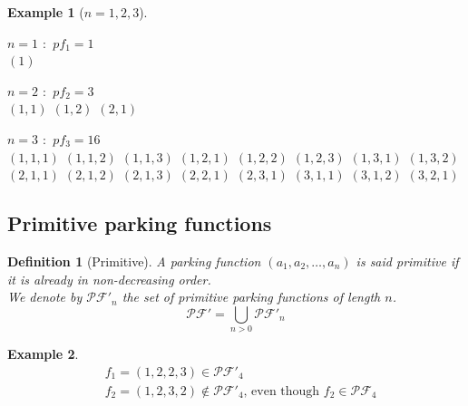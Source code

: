\documentclass[12pt]{report}
\newtheorem{definition}{Definition}
\newtheorem*{example}{Example}
\begin{document}
\begin{example}[$n = 1, 2, 3$]
    \text{} \\
    \begin{itemize*}
            \item $n = 1$ \text{ } $:$ \text{ } $pf_1 = 1$\\
            \subitem $(1)$\\
            \item $n = 2$ \text{ } $:$ \text{ } $pf_2 = 3$\\
            \subitem $(1, 1)$
            \subitem $(1, 2)$
            \subitem $(2, 1)$\\
            \item $n = 3$ \text{ } $:$ \text{ } $pf_3 = 16$\\
            \subitem $(1, 1, 1)$
            \subitem $(1, 1, 2)$
            \subitem $(1, 1, 3)$
            \subitem $(1, 2, 1)$
            \subitem $(1, 2, 2)$
            \subitem $(1, 2, 3)$
            \subitem $(1, 3, 1)$
            \subitem $(1, 3, 2)$
            \subitem $(2, 1, 1)$
            \subitem $(2, 1, 2)$
            \subitem $(2, 1, 3)$
            \subitem $(2, 2, 1)$
            \subitem $(2, 3, 1)$
            \subitem $(3, 1, 1)$
            \subitem $(3, 1, 2)$
            \subitem $(3, 2, 1)$\\
    \end{itemize*}
\end{example}

\subsection{Primitive parking functions}

\begin{definition}[Primitive]
    A parking function $(a_1, a_2, \ldots, a_n)$ is said \emph{primitive} if
    it is already in non-decreasing order. \\
    We denote by $\mathcal{PF'}_n$ the set of primitive parking functions of length $n$.
    $$\mathcal{PF'} = \bigcup_{n > 0}{\mathcal{PF'}_n}$$
    
\end{definition}

\begin{example}
    \begin{align*}
        &f_1 = (1, 2, 2, 3) \in \mathcal{PF'}_4\\
        &f_2 = (1, 2, 3, 2) \notin \mathcal{PF'}_4
         \text{, even though } f_2 \in \mathcal{PF}_4\\
    \end{align*}
\end{example}
\end{document}
